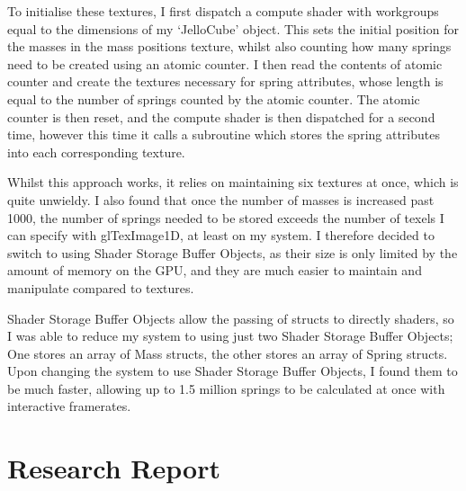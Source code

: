 \documentclass[]{acmsiggraph}
\begin{document}
To initialise these textures, I first dispatch a compute shader with workgroups equal to the dimensions of my ‘JelloCube’ object. This sets the initial position for the masses in the mass positions texture, whilst also counting how many springs need to be created using an atomic counter. I then read the contents of atomic counter and create the textures necessary for spring attributes, whose length is equal to the number of springs counted by the atomic counter. The atomic counter is then reset, and the compute shader is then dispatched for a second time, however this time it calls a subroutine which stores the spring attributes into each corresponding texture.

Whilst this approach works, it relies on maintaining six textures at once, which is quite unwieldy. I also found that once the number of masses is increased past 1000, the number of springs needed to be stored exceeds the number of texels I can specify with glTexImage1D, at least on my system. I therefore decided to switch to using Shader Storage Buffer Objects, as their size is only limited by the amount of memory on the GPU, and they are much easier to maintain and manipulate compared to textures.

Shader Storage Buffer Objects allow the passing of structs to directly shaders, so I was able to reduce my system to using just two Shader Storage Buffer Objects; One stores an array of Mass structs, the other stores an array of Spring structs. Upon changing the system to use Shader Storage Buffer Objects, I found them to be much faster, allowing up to 1.5 million springs to be calculated at once with interactive framerates.

\section{Research Report} \label{sec:report}



\end{document}
